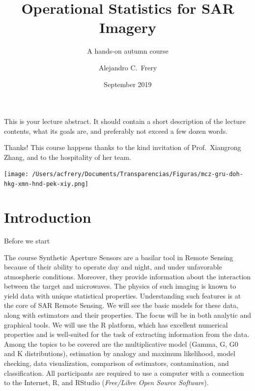 \documentclass{beamer}
\title{Operational Statistics for SAR Imagery}
\subtitle{A hands-on autumn course}
\date{September 2019}
\author{Alejandro C.\ Frery}
\institute{%
Laborat\'orio de Computa\c c\~ao Cient\'ifica e An\'alise Num\'erica\\
Universidade Federal de Alagoas
}
\begin{document}
\maketitle

\mode*  %

This is your lecture abstract. It should contain a short description of the lecture contents, what its goals are, and preferably not exceed a few dozen words.

\begin{frame}{Thanks!}
	This course happens thanks to the kind invitation of Prof.\ Xiangrong Zhang, and to the hospitality of her team.
	
	\centering
	\texttt{[image: /Users/acfrery/Documents/Transparencias/Figuras/mcz-gru-doh-hkg-xmn-hnd-pek-xiy.png]}
\end{frame}


\section{Introduction}

\begin{frame}{Before we start}
\begin{alertblock}{The course}
{\scriptsize Synthetic Aperture Sensors are a basilar tool in Remote Sensing because of their ability to operate day and night, and under unfavorable atmospheric conditions. Moreover, they provide information about the interaction between the target and microwaves. The physics of such imaging is known to yield data with unique statistical properties. Understanding such features is at the core of SAR Remote Sensing. We will see the basic models for these data, along with estimators and their properties. The focus will be in both analytic and graphical tools. We will use the R platform, which has excellent numerical properties and is well-suited for the task of extracting information from the data. Among the topics to be covered are the multiplicative model (Gamma, G, G0 and K distributions), estimation by analogy and maximum likelihood, model checking, data visualization, comparison of estimators, contamination, and classification. All participants are required to use a computer with a connection to the Internet, R, and RStudio (\textit{Free/Libre Open Source Software}).}
\end{alertblock}
\end{frame}
\end{document}
